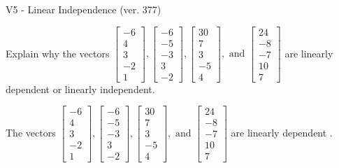 \begin{exercise}
  \begin{exerciseTitle}V5 - Linear Independence (ver. 377)\end{exerciseTitle}
  \begin{exerciseStatement}
    Explain why the vectors \(\left[\begin{array}{r}
-6 \\
4 \\
3 \\
-2 \\
1
\end{array}\right] , \left[\begin{array}{r}
-6 \\
-5 \\
-3 \\
3 \\
-2
\end{array}\right] , \left[\begin{array}{r}
30 \\
7 \\
3 \\
-5 \\
4
\end{array}\right] , \text{ and } \left[\begin{array}{r}
24 \\
-8 \\
-7 \\
10 \\
7
\end{array}\right]\) are linearly dependent or linearly independent.	


  \end{exerciseStatement}
  \begin{exerciseAnswer}
   The vectors \(\left[\begin{array}{r}
-6 \\
4 \\
3 \\
-2 \\
1
\end{array}\right] , \left[\begin{array}{r}
-6 \\
-5 \\
-3 \\
3 \\
-2
\end{array}\right] , \left[\begin{array}{r}
30 \\
7 \\
3 \\
-5 \\
4
\end{array}\right] , \text{ and } \left[\begin{array}{r}
24 \\
-8 \\
-7 \\
10 \\
7
\end{array}\right]\) are 
  	 linearly dependent  .
  


  \end{exerciseAnswer}
\end{exercise}